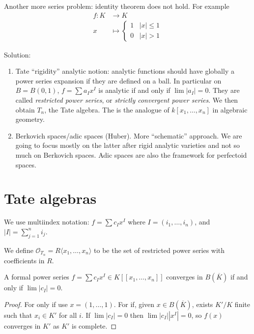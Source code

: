 \documentclass[a4paper]{article}
\begin{document}
Another more series problem: identity theorem does not hold. For example
\begin{align*}
  f: K &\to K \\
  x &\mapsto
      \begin{cases}
        1 & |x| \leq 1 \\
        0 & |x| > 1
      \end{cases}
\end{align*}

Solution:
\begin{enumerate}
\item Tate ``rigidity'' analytic notion: analytic functions should have globally a power series expansion if they are defined on a ball. In particular on \(B = B(0, 1)\), \(f = \sum a_I x^I\) is analytic if and only if \(\lim |a_I| = 0\). They are called \emph{restricted power series}, or \emph{strictly convergent power series}. We then obtain \(T_n\), the Tate algebra. The is the analogue of \(k[x_1, \dots, x_n]\) in algebraic geometry.
\item Berkovich spaces/adic spaces (Huber). More ``schematic'' approach. We are going to focus mostly on the latter after rigid analytic varieties and not so much on Berkovich spaces. Adic spaces are also the framework for perfectoid spaces.
\end{enumerate}

\section{Tate algebras}

\begin{notation}
  We use multiindex notation: \(f = \sum c_I x^I\) where \(I = (i_1, \dots, i_n)\), and \(|I| = \sum_{j = 1}^n i_j\).

  We define \(\mathcal O_{T_n} = R\langle x_1, \dots, x_n\rangle\) to be the set of restricted power series with coefficients in \(R\).
\end{notation}

\begin{lemma}
  A formal power series \(f = \sum c_I x^I \in K[[x_1, \dots, x_n]]\) converges in \(B(\overline K)\) if and only if \(\lim |c_I| = 0\).
\end{lemma}

\begin{proof}
  For only if use \(x = (1, \dots, 1)\). For if, given \(x \in B(\overline K)\), exists \(K'/K\) finite such that \(x_i \in K'\) for all \(i\). If \(\lim |c_I| = 0\) then \(\lim |c_I| |x^I| = 0\), so \(f(x)\) converges in \(K'\) as \(K'\) is complete.
\end{proof}
\end{document}
